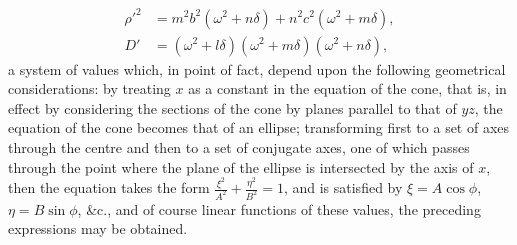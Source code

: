 \documentclass[11pt,a4paper]{article}
\theoremstyle{definition}
\begin{document}
\begin{align*}
\rho'^{2} &= m^{2}b^{2}(\omega^{2} + n\delta) + n^{2}c^{2}(\omega^{2} + m\delta), \\
D' &= (\omega^{2} + l\delta)(\omega^{2} + m\delta)(\omega^{2} + n\delta),
\end{align*}
a system of values which, in point of fact, depend upon the following geometrical considerations: by treating $x$ as a constant in the equation of the cone, that is, in effect by considering the sections of the cone by planes parallel to that of $yz$, the equation of the cone becomes that of an ellipse; transforming first to a set of axes through the centre and then to a set of conjugate axes, one of which passes through the point where the plane of the ellipse is intersected by the axis of $x$, then the equation takes the form $\frac{\xi^{2}}{A^{2}} + \frac{\eta^{2}}{B^{2}} = 1$, and is satisfied by $\xi = A\cos\phi$, $\eta = B\sin\phi$, \&c., and of course linear functions of these values, the preceding expressions may be obtained.

\newpage

\setcounter{page}{436}
\end{document}
